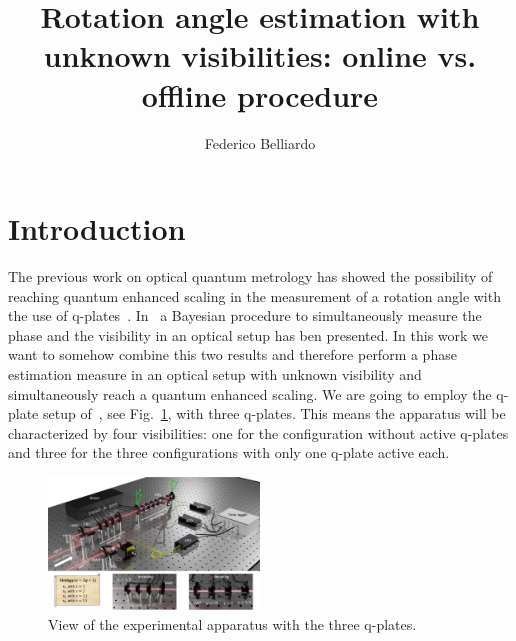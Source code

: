 \documentclass[aps, pra, 10pt, twocolumn, superscriptaddress,floatfix]{revtex4-1}
\begin{document}
%
\title{Rotation angle estimation with unknown visibilities: online vs. offline procedure} 
%

\author{Federico Belliardo}

\maketitle


\section{Introduction}
%
The previous work on optical quantum metrology has showed the possibility of reaching quantum enhanced scaling in the measurement of a rotation angle with the use of q-plates~\cite{Cimini2021}. In~\cite{Roccia2018} a Bayesian procedure to simultaneously measure the phase and the visibility in an optical setup has ben presented. In this work we want to somehow combine this two results and therefore perform a phase estimation measure in an optical setup with unknown visibility and simultaneously reach a quantum enhanced scaling. We are going to employ the q-plate setup of~\cite{Cimini2021}, see Fig.~\ref{fig:apparatus}, with three q-plates. This means the apparatus will be characterized by four visibilities: one for the configuration without active q-plates and three for the three configurations with only one q-plate active each. 
%
\begin{figure}[!t]
	\begin{center}
		\includegraphics[width=0.5\textwidth]{FigureSetup.pdf}
	\end{center}
	\caption{View of the experimental apparatus with the three q-plates.}
	\label{fig:apparatus}
\end{figure}
%
\end{document}
